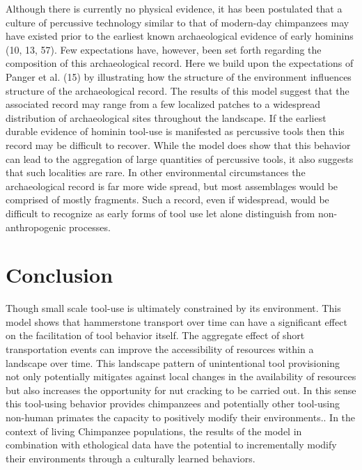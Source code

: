 \documentclass[9pt,twocolumn,twoside,]{pnas-new}
\begin{document}
Although there is currently no physical evidence, it has been postulated
that a culture of percussive technology similar to that of modern-day
chimpanzees may have existed prior to the earliest known archaeological
evidence of early hominins (10, 13, 57). Few expectations have, however,
been set forth regarding the composition of this archaeological record.
Here we build upon the expectations of Panger et al. (15) by
illustrating how the structure of the environment influences structure
of the archaeological record. The results of this model suggest that the
associated record may range from a few localized patches to a widespread
distribution of archaeological sites throughout the landscape. If the
earliest durable evidence of hominin tool-use is manifested as
percussive tools then this record may be difficult to recover. While the
model does show that this behavior can lead to the aggregation of large
quantities of percussive tools, it also suggests that such localities
are rare. In other environmental circumstances the archaeological record
is far more wide spread, but most assemblages would be comprised of
mostly fragments. Such a record, even if widespread, would be difficult
to recognize as early forms of tool use let alone distinguish from
non-anthropogenic processes.

\hypertarget{conclusion}{%
\section{Conclusion}\label{conclusion}}

Though small scale tool-use is ultimately constrained by its
environment. This model shows that hammerstone transport over time can
have a significant effect on the facilitation of tool behavior itself.
The aggregate effect of short transportation events can improve the
accessibility of resources within a landscape over time. This landscape
pattern of unintentional tool provisioning not only potentially
mitigates against local changes in the availability of resources but
also increases the opportunity for nut cracking to be carried out. In
this sense this tool-using behavior provides chimpanzees and potentially
other tool-using non-human primates the capacity to positively modify
their environments.. In the context of living Chimpanzee populations,
the results of the model in combination with ethological data have the
potential to incrementally modify their environments through a
culturally learned behaviors.

\showmatmethods
\showacknow
\pnasbreak
\end{document}
